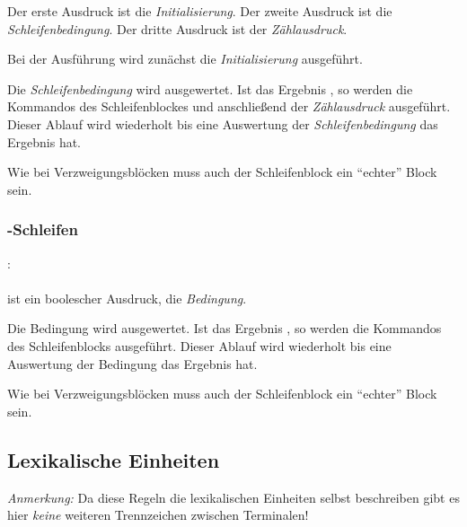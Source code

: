 Der erste Ausdruck ist die \emph{Initialisierung}. Der zweite Ausdruck ist die \emph{Schleifenbedingung}. Der dritte Ausdruck ist der \emph{Zählausdruck}.

Bei der Ausführung wird zunächst die \emph{Initialisierung} ausgeführt.

Die \emph{Schleifenbedingung} wird ausgewertet. Ist das Ergebnis , so werden die Kommandos des Schleifenblockes
und anschließend der \emph{Zählausdruck} ausgeführt.
Dieser Ablauf wird wiederholt bis eine Auswertung der \emph{Schleifenbedingung} das Ergebnis  hat.

Wie bei Verzweigungsblöcken muss auch der Schleifenblock ein "`echter"' Block sein.


\subsubsection{-Schleifen}\label{$_backslash$kw__while__-Schleifen}
:\label{schleife_while}\\
\hspace*{1cm}\Gspace\Gt{(}\Gspace{} \Gspace\Gt{)}\Gspace\Gt{\{}\Gspace{} \Gspace\Gt{\}}\\

\glq{}\grq ist ein boolescher Ausdruck, die \emph{Bedingung}.

Die Bedingung wird ausgewertet. Ist das Ergebnis , so werden die Kommandos des Schleifenblocks
ausgeführt. Dieser Ablauf wird wiederholt bis eine Auswertung der Bedingung das Ergebnis  hat.

Wie bei Verzweigungsblöcken muss auch der Schleifenblock ein "`echter"' Block sein.


\subsection{Lexikalische Einheiten}\label{Lexikalische Einheiten}

\emph{Anmerkung:} Da diese Regeln die lexikalischen Einheiten selbst beschreiben gibt es
hier \emph{keine} weiteren Trennzeichen zwischen Terminalen!


